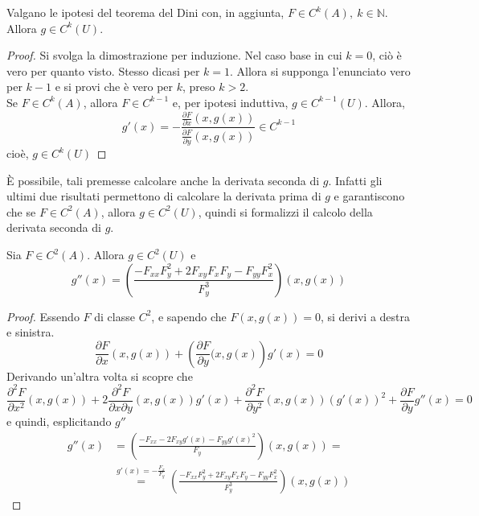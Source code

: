 \begin{corollary}
    Valgano le ipotesi del teorema del Dini con, in aggiunta, $F \in C^k(A),\ k \in \mathbb{N}$. Allora $g \in C^k(U)$.
\end{corollary}
\begin{proof}
    Si svolga la dimostrazione per induzione.
    Nel caso base in cui $k=0$, ciò è vero per quanto visto. Stesso dicasi per $k=1$. Allora si supponga l'enunciato vero per $k-1$ e si provi che è vero per $k$, preso $k>2$.\\
    Se $F \in C^k(A)$, allora $F \in C^{k-1}$ e, per ipotesi induttiva, $g \in C^{k-1}(U)$. Allora, 
    \begin{equation}
         g'(x)=-\frac{\frac{\partial{F}}{\partial{x}}(x, g(x))}{\frac{\partial{F}}{\partial{y}}(x, g(x))} \in C^{k-1}
    \end{equation}
    cioè, $g \in C^k(U)$
\end{proof}
È possibile, tali premesse calcolare anche la derivata seconda di $g$. Infatti gli ultimi due risultati permettono di calcolare la derivata prima di $g$ e garantiscono che se $F \in C^2(A)$, allora $g \in C^2(U)$, quindi si formalizzi il calcolo della derivata seconda di $g$.
\begin{theorem}
Sia $F \in C^2(A)$. Allora $g \in C^2(U)$ e
\begin{equation}
    g''(x)= \left(\frac{-F_{xx}F_{y}^2+2F_{xy}F_xF_y-F_{yy}F_x^2}{F_y^3}\right)(x, g(x))
\end{equation}
\end{theorem}
\begin{proof}
Essendo $F$ di classe $C^2$, e sapendo che $F(x,g(x))=0$, si derivi a destra e sinistra.
\begin{equation}
    \frac{\partial{F}}{\partial{x}}(x, g(x))+\left(\frac{\partial{F}}{\partial{y}}(x, g(x)\right)g'(x)=0
\end{equation}
Derivando un'altra volta si scopre che
\begin{equation}
    \frac{\partial^2{F}}{\partial{x^2}}(x, g(x))+ 2 \frac{\partial^2{F}}{\partial{x}\partial{y}}(x, g(x))g'(x) + \frac{\partial^2{F}}{\partial{y^2}}(x, g(x))(g'(x))^2+ \frac{\partial{F}}{\partial{y}}g''(x) =0
\end{equation}
e quindi, esplicitando $g''$
\begin{equation}
\begin{aligned}
    g''(x)&= \left(\frac{-F_{xx}-2F_{xy}g'(x)- F_{yy}g'(x)^2}{F_y}\right)(x, g(x))=\\
    &\overset{g'(x)=-\tfrac{F_x}{F_y}}{=} \left(\frac{-F_{xx}F_{y}^2+2F_{xy}F_xF_y-F_{yy}F_x^2}{F_y^3}\right)(x, g(x))
\end{aligned}
\end{equation}
\end{proof}
